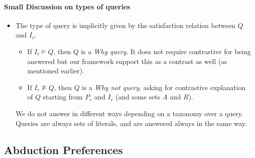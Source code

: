 \paragraph{Small Discussion on types of queries}
\begin{itemize}
  \item The type of query is implicitly given by the satisfaction relation between $Q$ and $I_r$.
  \begin{itemize}
    \item If $I_r \models Q$, then $Q$ is a \emph{Why query}. It does not require contrastive for being answered but our framework support this as a contrast as well (as mentioned earlier).
    \item If $I_r \nvDash Q$, then $Q$ is a \emph{Why not query}, asking for contrastive explanation of $Q$ starting from $P_r$ and $I_r$ (and some sets $A$ and $R$).
  \end{itemize}
  We do not answer in different ways depending on a taxonomy over a query. Queries are always sets of literals, and are answered always in the same way.
\end{itemize}


\subsection{Abduction Preferences}

